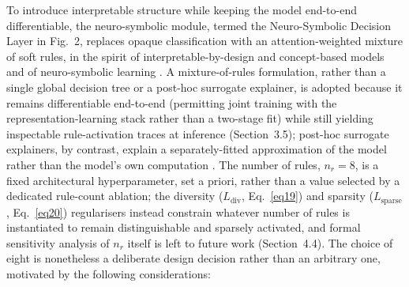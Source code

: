 \documentclass[pdflatex,sn-basic,Numbered]{sn-jnl}
\begin{document}
To introduce interpretable structure while keeping the model end-to-end differentiable, the neuro-symbolic module, termed the Neuro-Symbolic Decision Layer in Fig.~2, replaces opaque classification with an attention-weighted mixture of soft rules, in the spirit of interpretable-by-design and concept-based models \cite{ref45,ref46} and of neuro-symbolic learning \cite{ref47}. A mixture-of-rules formulation, rather than a single global decision tree or a post-hoc surrogate explainer, is adopted because it remains differentiable end-to-end (permitting joint training with the representation-learning stack rather than a two-stage fit) while still yielding inspectable rule-activation traces at inference (Section~3.5); post-hoc surrogate explainers, by contrast, explain a separately-fitted approximation of the model rather than the model's own computation \cite{ref34}. The number of rules, $n_r=8$, is a fixed architectural hyperparameter, set a priori, rather than a value selected by a dedicated rule-count ablation; the diversity ($L_{\mathrm{div}}$, Eq.~\eqref{eq19}) and sparsity ($L_{\mathrm{sparse}}$, Eq.~\eqref{eq20}) regularisers instead constrain whatever number of rules is instantiated to remain distinguishable and sparsely activated, and formal sensitivity analysis of $n_r$ itself is left to future work (Section~4.4). The choice of eight is nonetheless a deliberate design decision rather than an arbitrary one, motivated by the following considerations:
\end{document}
